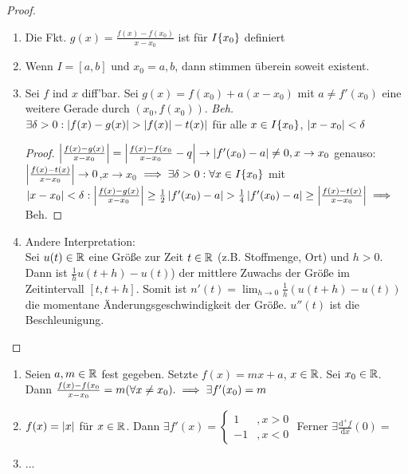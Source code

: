 \documentclass[12pt]{scrreprt}
\begin{document}
\begin{proof}
\begin{enumerate}
\item Die Fkt. $g(x) = \frac{f(x) - f(x_0)}{x-x_0}$ ist für $I\\\{x_0\}$ definiert
\item Wenn $I=[a,b]$ und $x_0=a,b$, dann stimmen %
überein soweit existent.
\item Sei $f$ ind $x$ diff'bar. Sei $g(x) = f(x_0) + a(x-x_0)$ mit $a \ne f'(x_0)$ eine weitere Gerade durch
$(x_0, f(x_0))$. \emph{Beh.} $\exists \delta > 0: \left\lvert f(x) - g(x)\right\lvert > \left\lvert f(x)\right\lvert-t(x)|$ für alle 
$x \in I\\\{x_0\} $, $\left\lvert x-x_0\right\lvert < \delta$
\begin{proof}
$\left\lvert\frac{f(x) - g(x)}{x-x_0}\right\lvert = \left\lvert\frac{f(x)-f(x_0}{x-x_0} - q\right\lvert \to \left\lvert f'(x_0)-a\right\lvert \ne 0, x\to x_0$
genauso: $\left\lvert\frac{f(x)-t(x)}{x-x_0}\right\lvert \to 0$,$x\to x_0$
$\implies \exists\delta>0:\forall x\in I\\\{x_0\}$ mit $\left\lvert x-x_0\right\lvert < \delta:\left\lvert\frac{f(x)-g(x)}{x-x_0}\right\lvert\ge
\frac{1}{2}\left\lvert f'(x_0) -a\right\lvert > \frac{1}{4}\left\lvert f'(x_0)-a\right\lvert\ge\left\lvert\frac{f(x)-t(x)}{x-x_0}\right\lvert \implies$ Beh.
\end{proof}
\item Andere Interpretation:\\
Sei $u(t) \in \mathbb{R}$ eine Größe zur Zeit $t\in\mathbb{R}$ (z.B. Stoffmenge, Ort) und $h>0$.
Dann ist $\frac{1}{h}u(t+h) - u(t)$) der mittlere Zuwachs der Größe im Zeitintervall $[t, t+h]$. Somit ist
$n'(t) = \lim_{h\to 0}\frac{1}{h}(u(t+h)-u(t))$ die momentane Änderungsgeschwindigkeit der Größe. $u''(t)$ ist die Beschleunigung.
\end{enumerate}
\end{proof}

\begin{bsp}\label{}
\begin{enumerate}
\item Seien $a, m \in \mathbb{R}$ fest gegeben. Setzte $f(x) = mx +a$, $x\in\mathbb{R}$. Sei $x_0 \in \mathbb{R}$.
Dann $\frac{f(x)-f(x_0}{x-x_0} = m(\forall{x}\ne x_0). \implies \exists f'(x_0)=m$
\item $f(x) = \left\lvert x\right\lvert$ für $x\in \mathbb{R}$. Dann $\exists f'(x)=\begin{cases}
1 &, x > 0 \\ -1 &, x < 0
\end{cases} $ Ferner $\exists \frac{\mathrm{d}^+f}{\mathrm{d}x}(0)= $

\item ...
\end{enumerate}
\end{bsp}
\end{document}
